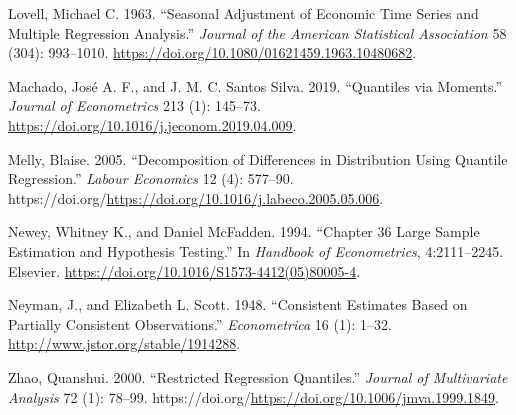 \documentclass[
  letterpaper,
  DIV=11,
  numbers=noendperiod]{scrartcl}
\newlength{\cslhangindent}
\newlength{\cslentryspacingunit} %
\newenvironment{CSLReferences}[2] %
 {%
  \setlength{\parindent}{0pt}
  \ifodd #1
  \let\oldpar\par
  \def\par{\hangindent=\cslhangindent\oldpar}
  \fi
  \setlength{\parskip}{#2\cslentryspacingunit}
 }%
 {}
\begin{document}
\begin{CSLReferences}{1}{0}
\leavevmode{}%
Lovell, Michael C. 1963. {``Seasonal Adjustment of Economic Time Series
and Multiple Regression Analysis.''} \emph{Journal of the American
Statistical Association} 58 (304): 993--1010.
\url{https://doi.org/10.1080/01621459.1963.10480682}.

\leavevmode{}%
Machado, José A. F., and J. M. C. Santos Silva. 2019. {``Quantiles via
Moments.''} \emph{Journal of Econometrics} 213 (1): 145--73.
\url{https://doi.org/10.1016/j.jeconom.2019.04.009}.

\leavevmode{}%
Melly, Blaise. 2005. {``Decomposition of Differences in Distribution
Using Quantile Regression.''} \emph{Labour Economics} 12 (4): 577--90.
https://doi.org/\url{https://doi.org/10.1016/j.labeco.2005.05.006}.

\leavevmode{}%
Newey, Whitney K., and Daniel McFadden. 1994. {``Chapter 36 {Large}
Sample Estimation and Hypothesis Testing.''} In \emph{Handbook of
{Econometrics}}, 4:2111--2245. Elsevier.
\url{https://doi.org/10.1016/S1573-4412(05)80005-4}.

\leavevmode{}%
Neyman, J., and Elizabeth L. Scott. 1948. {``Consistent Estimates Based
on Partially Consistent Observations.''} \emph{Econometrica} 16 (1):
1--32. \url{http://www.jstor.org/stable/1914288}.

\leavevmode{}%
Zhao, Quanshui. 2000. {``Restricted {Regression} {Quantiles}.''}
\emph{Journal of Multivariate Analysis} 72 (1): 78--99.
https://doi.org/\url{https://doi.org/10.1006/jmva.1999.1849}.

\end{CSLReferences}
\end{document}
